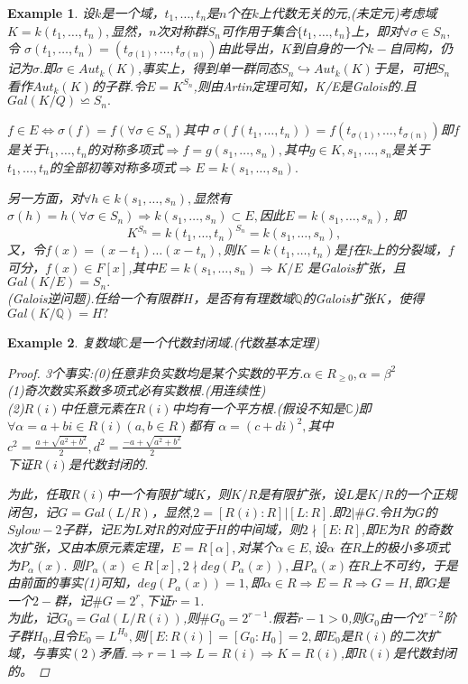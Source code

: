 \documentclass[UTF8]{article}
\newtheorem{exa}{Example}[section]
\begin{document}
\begin{exa}
设$k$是一个域，$t_1,\ldots,t_n$是$n$个在$k$上代数无关的元,(未定元)考虑域$K=k(t_1,\ldots,t_n),$显然，$n$次对称群$S_n$可作用于集合$\{t_1,\ldots,t_n\}$上，即对$\forall\sigma\in S_n,$令
$\sigma(t_1,\ldots,t_n)=(t_{\sigma(1)},\ldots,t_{\sigma(n)})$由此导出，$K$到自身的一个$k-$自同构，仍记为$\sigma.$即$\sigma\in Aut_k(K)$,事实上，得到单一群同态$S_n\hookrightarrow Aut_k(K)$于是，可把$S_n$ 看作$Aut_k(K)$的子群.令$E=K^{S_n}$,则由Artin定理可知，K/E是Galois的.且$Gal(K/Q)\backsimeq S_n.$


$f\in E\Leftrightarrow \sigma(f)=f(\forall\sigma\in S_n)$其中
$\sigma(f(t_1,\ldots,t_n))=f(t_{\sigma(1)},\ldots,t_{\sigma(n)})$即$f$是关于$t_1,\ldots,t_n$的对称多项式$\Rightarrow f=g(s_1,\ldots,s_n),$其中$g\in K,s_1,\ldots,s_n$是关于$t_1,\ldots,t_n$的全部初等对称多项式$\Rightarrow E=k(s_1,\ldots,s_n).$


另一方面，对$\forall h\in k(s_1,\ldots,s_n),$显然有$\sigma(h)=h(\forall\sigma\in S_n)\Rightarrow k(s_1,\ldots,s_n)\subset E,$因此$E=k(s_1,\ldots,s_n)$,
即
$$K^{S_n}=k(t_1,\ldots,t_n)^{S_n}=k(s_1,\ldots,s_n),$$
又，令$f(x)=(x-t_1)\ldots(x-t_n),$则$K=k(t_1,\ldots,t_n)$是$f$在$k$上的分裂域，$f$可分，$f(x)\in F[x]$,其中$E=k(s_1,\ldots,s_n)\Rightarrow K/E$ 是Galois扩张，且$Gal(K/E)=S_n.$\\
(Galois逆问题).任给一个有限群$H$，是否有有理数域$\mathbb{Q}$的Galois扩张$K$，使得$Gal(K/\mathbb{Q})=H?$\\
\end{exa}
\begin{exa}
复数域$\mathbb{C}$是一个代数封闭域.(代数基本定理)
\begin{proof}
	3个事实:(0)任意非负实数均是某个实数的平方.$\alpha\in R_{\geqslant0},\alpha=\beta^2$\\
	(1)奇次数实系数多项式必有实数根.(用连续性)\\
	(2)$R(i)$中任意元素在$R(i)$中均有一个平方根.(假设不知是$\mathbb{C}$)即$\forall \alpha=a+bi\in R(i)(a,b\in R)$都有
	$\alpha=(c+di)^2,$其中$c^2=\frac{a+\sqrt{a^2+b^2}}{2},d^2=\frac{-a+\sqrt{a^2+b^2}}{2}$\\
	下证$R(i)$是代数封闭的.
	
	
	为此，任取$R(i)$中一个有限扩域$K$，则$K/R$是有限扩张，设$L$是$K/R$的一个正规闭包，记$G=Gal(L/R)$，显然,$2=[R(i):R]|[L:R]$.即$2|\#G.$令$H$为$G$的$Sylow-2$子群，记$E$为$L$对$R$的对应于$H$的中间域，则$2\nmid[E:R]$,即$E$为$R$ 的奇数次扩张，又由本原元素定理，$E=R[\alpha],$对某个$\alpha\in E,$设$\alpha$ 在$R$上的极小多项式为$P_{\alpha}(x).$ 则$P_{\alpha}(x)\in R[x],2\nmid deg(P_{\alpha}(x)),$且$P_{\alpha}(x)$在$R$上不可约，于是由前面的事实(1)可知，$deg(P_{\alpha}(x))=1,$即$\alpha\in R\Rightarrow E=R\Rightarrow G=H,$即$G$是一个$2- $群，记$\#G=2^r,$下证$r=1$.\\
	为此，记$G_0=Gal(L/R(i))$,则$\#G_0=2^{r-1}$.假若$r-1>0$,则$G_0$由一个$2^{r-2}$阶子群$H_0$,且令$E_0=L^{H_0},$则$[E:R(i)]=[G_0:H_0]=2,$即$E_0$是$R(i)$的二次扩域，与事实$(2)$矛盾.$\Rightarrow r=1\Rightarrow L=R(i)\Rightarrow K=R(i)$,即$R(i)$是代数封闭的。
\end{proof}
\end{exa}
\end{document}
